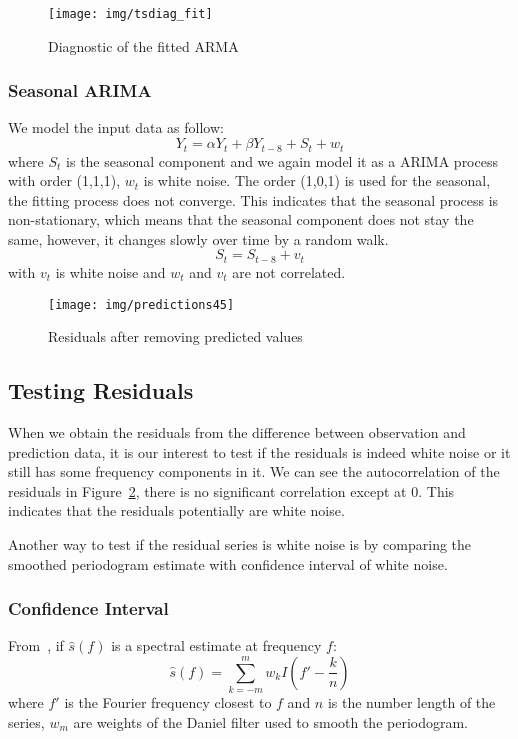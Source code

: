 \documentclass[12pt]{article}
\begin{document}
\begin{figure}[ht!]
\centering
\texttt{[image: img/tsdiag\_fit]}
\caption{Diagnostic of the fitted ARMA}\label{fig:tsdiag_fit}
\end{figure}

\subsubsection{Seasonal ARIMA}
We model the input data as follow:
\begin{equation}
Y_t = \alpha Y_t+\beta Y_{t-8}+S_t+w_t
\end{equation}
where $S_t$ is the seasonal component and we again model it as a ARIMA process
with order (1,1,1), $w_t$ is white noise. The order (1,0,1) is used for the
seasonal, the fitting process does not converge. This indicates that the seasonal process is
non-stationary, which means that the seasonal component does not stay the same,
however, it changes slowly over time by a random walk.
\begin{equation}
S_t = S_{t-8}+v_t
\end{equation}
with $v_t$ is white noise and $w_t$ and $v_t$ are not correlated.

\begin{figure}[ht!]
\centering
\texttt{[image: img/predictions45]}
\caption{Residuals after removing predicted values}\label{fig:predictions45}
\end{figure}

\subsection{Testing Residuals}
When we obtain the residuals from the difference between observation and
prediction data, it is our interest to test if the residuals is indeed white
noise or it still has some frequency components in it. We can see the
autocorrelation of the residuals in Figure~\ref{fig:predictions45}, there is no
significant correlation except at 0. This indicates that the residuals
potentially are white noise.

Another way to test if the residual series is white noise is by comparing the
smoothed periodogram estimate with confidence interval of white noise.

\subsubsection{Confidence Interval}
From~\cite{bloomfieldFourierTimeSeries}, if $\hat{s}(f)$ is a spectral estimate
at frequency $f$: 
\begin{equation}
\hat{s}(f)=\sum_{k=-m}^mw_kI(f'-\frac{k}{n})
\end{equation}
where $f'$ is the Fourier frequency closest to $f$ and $n$ is the number length
of the series, $w_m$ are weights of the Daniel filter used to smooth the
periodogram.
\end{document}
